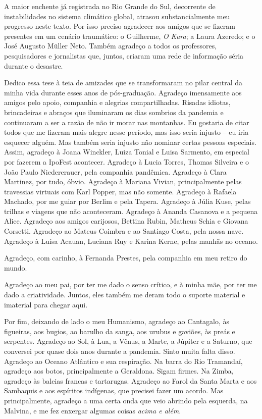 \documentclass[./main.tex]{subfiles}
\begin{document}
\par A maior enchente já registrada no Rio Grande do Sul, decorrente de instabilidades no sistema climático global, atrasou substancialmente meu progresso neste texto. Por isso preciso agradecer aos amigos que se fizeram presentes em um cenário traumático: o Guilherme, \textit{O Kura}; a Laura Azeredo; e o José Augusto Müller Neto. Também agradeço a todos os professores, pesquisadores e jornalistas que, juntos, criaram uma rede de informação séria durante o desastre.

\par Dedico essa tese à teia de amizades que se transformaram no pilar central da minha vida durante esses anos de pós-graduação. Agradeço imensamente aos amigos pelo apoio, companhia e alegrias compartilhadas. Risadas idiotas, brincadeiras e abraços que iluminaram os dias sombrios da pandemia e continuaram a ser a razão de não ir morar nas montanhas. Eu gostaria de citar todos que me fizeram mais alegre nesse período, mas isso seria injusto -- eu iria esquecer alguém. Mas também seria injusto não nominar certas pessoas especiais. Assim, agradeço à Joana Winckler, Luiza Tonial e Luisa Sarmento, em especial por fazerem a IpoFest acontecer. Agradeço à Lucia Torres, Thomas Silveira e o João Paulo Niedererauer, pela companhia pandêmica. Agradeço à Clara Martinez, por tudo, óbvio. Agradeço à Mariana Vivian, principalmente pelas travessias virtuais com Karl Popper, mas não somente. Agradeço à Rafaela Machado, por me guiar por Berlim e pela Tapera. Agradeço à Júlia Kuse, pelas trilhas e viagens que não aconteceram. Agradeço à Ananda Casanova e a pequena Alice. Agradeço aos amigos carijosos, Bettina Rubin, Matheus Schia e Giovana Corsetti. Agradeço ao Mateus Coimbra e ao Santiago Costa, pela nossa nave. Agradeço à Luísa Acauan, Luciana Ruy e Karina Kerne, pelas manhãs no oceano.

\par Agradeço, com carinho, à Fernanda Prestes, pela companhia em meu retiro do mundo.

\par Agradeço ao meu pai, por ter me dado o senso crítico, e à minha mãe, por ter me dado a criatividade. Juntos, eles também me deram todo o suporte material e imaterial para chegar aqui.

\par Por fim, deixando de lado o meu Humanismo, agradeço ao Cantagalo, às figueiras, aos bugios, ao barulho da sanga, aos urubus e gaviões, às preás e serpentes. Agradeço ao Sol, à Lua, a Vênus, a Marte, a Júpiter e a Saturno, que conversei por quase dois anos durante a pandemia. Sinto muita falta disso. Agradeço ao Oceano Atlântico e sua respiração. Na barra do Rio Tramandaí, agradeço aos botos, principalmente a Geraldona. Sigam firmes. Na Zimba, agradeço às baleias francas e tartarugas. Agradeço ao Farol da Santa Marta e aos Sambaquis e aos espíritos indígenas, que precisei fazer um acordo. Mas principalmente, agradeço a uma certa onda que veio abrindo pela esquerda, na Malvina, e me fez enxergar algumas coisas \textit{acima e além}. 

\clearpage
\end{document}
